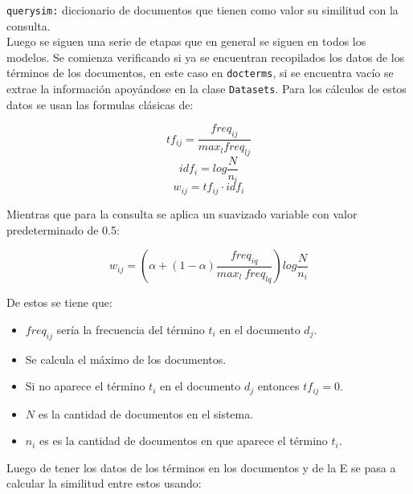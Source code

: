 \documentclass[spanish]{article}
\begin{document}
		\texttt{querysim:} diccionario de documentos que tienen como valor su similitud con la consulta.\\

		Luego se siguen una serie de etapas que en general se siguen en todos los modelos. Se comienza verificando si ya se encuentran recopilados los datos de los términos de los documentos, en este caso en \texttt{docterms}, si se encuentra vacío se extrae la información apoyándose en la clase \texttt{Datasets}. Para los cálculos de estos datos se usan las formulas clásicas de:
			
		\begin{equation}
			\displaystyle tf_{ij} =  \frac{freq_{ij}}{max_l freq_{lj}}
		\end{equation}
		\begin{equation}
			\displaystyle idf_i =  log⁡{\frac{N}{n_i}}
		\end{equation}
		\begin{equation}
			\displaystyle w_{ij} = tf_{ij} \cdot idf_i
		\end{equation}

		Mientras que para la consulta se aplica un suavizado variable con valor predeterminado de 0.5:
		
		\begin{equation}
			\displaystyle w_{ij} = \left( \alpha + 
\left( 1 - \alpha \right) \frac{freq_{iq}}{max_l \ freq_{lq}} \right) log⁡ \frac{N}{n_i}
		\end{equation}

		De estos se tiene que:

		\begin{itemize}
			\item $ freq_{ij} $ sería la frecuencia del término $ t_i $ en el documento $ d_j $.

			\item Se calcula el máximo de los documentos.

			\item Si no aparece el término $ t_i $ en el documento $ d_j $ entonces $ tf_{ij} = 0 $.

			\item $ N $ es la cantidad de documentos en el sistema.

			\item $ n_i $ es es la cantidad de documentos en que aparece el término $ t_i $.
		\end{itemize}

		Luego de tener los datos de los términos en los documentos y de la E se pasa a calcular la similitud entre estos usando:
	
\end{document}
